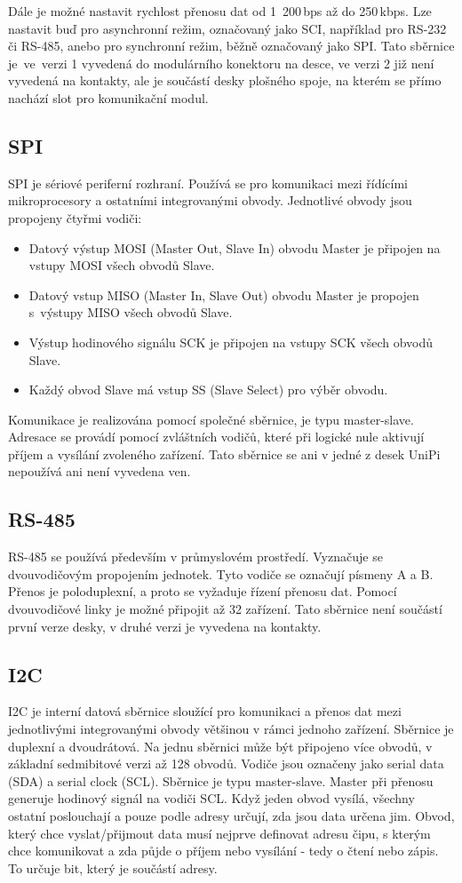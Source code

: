 Dále je možné nastavit rychlost přenosu dat od 1~200\,bps až do 250\,kbps. Lze nastavit buď pro asynchronní režim, označovaný jako SCI, například pro RS-232 či RS-485, anebo pro synchronní režim, běžně označovaný jako SPI. Tato sběrnice je~ve~verzi 1 vyvedená do modulárního konektoru na desce, ve verzi 2 již není vyvedená na kontakty, ale je součástí desky plošného spoje, na kterém se přímo nachází slot pro komunikační modul.


\subsection{SPI}
SPI je sériové periferní rozhraní. Používá se pro komunikaci mezi řídícími mikroprocesory a ostatními integrovanými obvody. Jednotlivé obvody jsou propojeny čtyřmi vodiči:
\begin{itemize}
	\item Datový výstup MOSI (Master Out, Slave In) obvodu Master je připojen na vstupy MOSI všech obvodů Slave.
	\item Datový vstup MISO (Master In, Slave Out) obvodu Master je propojen s~výstupy MISO všech obvodů Slave.
	\item Výstup hodinového signálu SCK je připojen na vstupy SCK všech obvodů Slave.
	\item Každý obvod Slave má vstup SS (Slave Select) pro výběr obvodu.
\end{itemize}
Komunikace je realizována pomocí společné sběrnice, je typu master-slave. Adresace se provádí pomocí zvláštních vodičů, které při logické nule aktivují příjem a vysílání zvoleného zařízení. Tato sběrnice se ani v jedné z desek UniPi nepoužívá ani není vyvedena ven.

\subsection{RS-485}
RS-485 se používá především v průmyslovém prostředí. Vyznačuje se dvouvodičovým propojením jednotek. Tyto vodiče se označují písmeny A a B. Přenos je poloduplexní, a proto se vyžaduje řízení přenosu dat. Pomocí dvouvodičové linky je možné připojit až 32 zařízení. Tato sběrnice není součástí první verze desky, v druhé verzi je vyvedena na kontakty.

\subsection{I2C}
I2C je interní datová sběrnice sloužící pro komunikaci a přenos dat mezi jednotlivými integrovanými obvody většinou v rámci jednoho zařízení. Sběrnice je duplexní a dvoudrátová. Na jednu sběrnici může být připojeno více obvodů, v základní sedmibitové verzi až 128 obvodů.
Vodiče jsou označeny jako serial data (SDA) a serial clock (SCL). Sběrnice je typu master-slave. Master při přenosu generuje hodinový signál na vodiči SCL. Když jeden obvod vysílá, všechny ostatní poslouchají a pouze podle adresy určují, zda jsou data určena jim. Obvod, který chce vyslat/přijmout data musí nejprve definovat adresu čipu, s kterým chce komunikovat a zda půjde o příjem nebo vysílání - tedy o čtení nebo zápis. To určuje bit, který je součástí adresy. 

